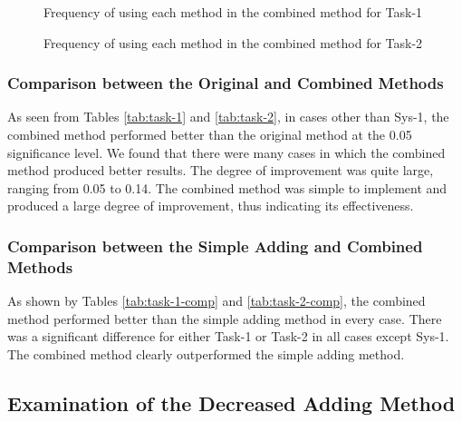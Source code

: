 \begin{figure}[p]
      \begin{center}
      \end{center}
      \caption{Frequency of using each method in the combined method for Task-1}
      \label{fig:task-1_freq}
\end{figure}

\begin{figure}[p]
      \begin{center}
      \end{center}
      \caption{Frequency of using each method in the combined method for Task-2}
      \label{fig:task-2_freq}
\end{figure}

\clearpage

\subsubsection{Comparison between the Original and Combined Methods}

As seen from Tables \ref{tab:task-1} and \ref{tab:task-2}, 
in cases other than Sys-1, 
the combined method performed better than 
the original method at the 0.05 significance level. 
We found that 
there were many cases in which 
the combined method produced better results. 
The degree of improvement was quite large, ranging from 0.05 to 0.14. 
The combined method was simple to implement and produced
a large degree of improvement, thus indicating its effectiveness. 

\subsubsection{Comparison between the Simple Adding and Combined Methods}

As shown by Tables \ref{tab:task-1-comp} and \ref{tab:task-2-comp}, 
the combined method performed better than 
the simple adding method in every case. 
There was a significant difference 
for either Task-1 or Task-2 in all cases except Sys-1. 
The combined method clearly outperformed 
the simple adding method.

\subsection{Examination of the Decreased Adding Method}

